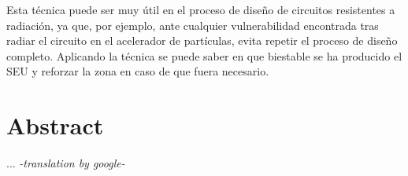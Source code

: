 Esta técnica puede ser muy útil en el proceso de diseño de circuitos resistentes a
radiación, ya que, por ejemplo, ante cualquier vulnerabilidad encontrada tras
radiar el circuito en el acelerador de partículas, evita repetir el proceso de
diseño completo. Aplicando la técnica se puede saber en que biestable se ha
producido el \gls{SEU} y reforzar la zona en caso de que fuera necesario.


\chapter*{Abstract}
\pagestyle{especial}
{}

\lettrine[lraise=-0.1, lines=2, loversize=0.2]{}{}

...
\emph{-translation by google-}

